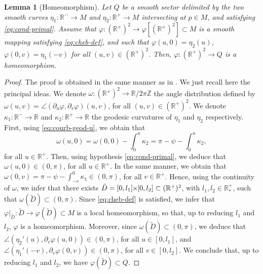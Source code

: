 \documentclass{article}
\newcommand{\PLH}{{\mkern-1mu\times\mkern-1mu}}
\newcommand{\Times}{\PLH}
\newcommand{\R}{\mathbb{R}}
\newcommand{\Z}{\mathbb{Z}}
\newcommand{\surf}{M}
\newcommand{\ko}{\kappa}
\newcommand{\DU}{\partial_{u}}
\newcommand{\DV}{\partial_{v}}
\newcommand{\sect}{Q}
\newtheorem{lemma}[theorem]{Lemma}
\theoremstyle{remark}
\theoremstyle{prpart}
\begin{document}
\begin{lemma}[Homeomorphism]\label{lem:homeo}
  Let $\sect$ be a smooth sector delimited by the two smooth curves $\eta_1:\R^-\to\surf$ and $\eta_2:\R^+\to\surf$ intersecting at $p\in\surf$, and satisfying \eqref{eq:cond-primal}. Assume that $\varphi :(\R^+)^2\to \varphi[(\R^+)^2]\subset\surf$ is a smooth mapping satisfying \eqref{eq:cheb-def}, and such that $\varphi(u, 0) = \eta_2(u)$, $\varphi(0,v) = \eta_1(-v)$ for all $(u,v)\in(\R^+)^2$. Then, $\varphi : (\R^+)^2\to \sect$ is a homeomorphism.
\end{lemma}

\begin{proof}
 The proof is obtained in the same manner as in \cite{Sam95}. We just recall here the principal ideas. We denote $\omega:(\R^+)^2\to\R/2\pi\Z$ the angle distribution defined by $\omega(u,v) = \angle(\DU\varphi,\DV\varphi)(u,v)$, for all $(u,v)\in (\R^+)^2$. We denote $\ko_1:\R^-\to\R$ and $\ko_2:\R^+\to\R$ the geodesic curvatures of $\eta_1$ and $\eta_2$ respectively. First, using \eqref{eq:courb-geod-u}, we obtain that 
\begin{equation*}
  \omega(u,0) = \omega(0,0) - \int_0^u\ko_2 = \pi-\psi-\int_0^u\ko_2,
\end{equation*}
for all $u\in\R^+$. Then, using hypothesis \eqref{eq:cond-primal}, we deduce that $\omega(u,0)\in(0,\pi)$, for all $u\in\R^+$. In the same manner, we obtain that $\omega(0,v) = \pi-\psi-\int_{-v}^0\ko_1\in(0,\pi)$, for all $v\in\R^+$. Hence, using the continuity of $\omega$, we infer that there exists $\tilde D=[0,l_1]\Times[0,l_2]\subset(\R^+)^2$, with $l_1,l_2\in\R^+_\ast$, such that $\omega(\tilde D)\subset(0,\pi)$. Since \eqref{eq:cheb-def} is satisfied, we infer that $\varphi\big|_{\tilde D}:\tilde D\to\varphi(\tilde D)\subset\surf$ is a local homeomorphism, so that, up to reducing $l_1$ and $l_2$, $\varphi$ is a homeomorphism. Moreover, since $\omega(\tilde D)\subset(0,\pi)$, we deduce that $\angle(\eta_2'(u),\DV\varphi(u,0))\in(0,\pi)$, for all $u\in[0,l_1]$, and $\angle(\eta_1'(-v),\DV\varphi(0,v))\in(0,\pi)$, for all $v\in[0,l_2]$. We conclude that, up to reducing $l_1$ and $l_2$, we have $\varphi(\tilde D)\subset \sect$.


\end{proof}
\end{document}
